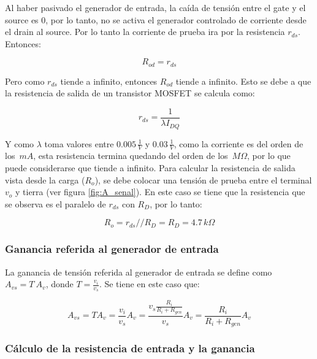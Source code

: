 \documentclass[10pt,spanish,a4paper,notitlepage]{article}
\begin{document}
Al haber pasivado el generador de entrada, la caída de tensión entre el gate y el source es 0, por lo tanto, no se activa el generador controlado de corriente desde el drain al source. Por lo tanto la corriente de prueba ira por la resistencia $r_{ds}$. Entonces: 

\begin{equation}
    R_{od}=r_{ds}
    \label{eq:A_Rod}
\end{equation}

Pero como $r_{ds}$ tiende a infinito, entonces $R_{od}$ tiende a infinito. Esto se debe a que la resistencia de salida de un transistor MOSFET se calcula como: 

\begin{equation}
    r_{ds}=\frac{1}{\lambda I_{DQ}}
    \label{eq:A_rds}
\end{equation}

Y como $\lambda$ toma valores entre $0.005\,\unit{\frac{1}{V}}$ y $0.03\,\unit{\frac{1}{V}}$, como la corriente es del orden de los  $\,\unit{mA}$, esta resistencia termina quedando del orden de los $\,\unit{M\Omega}$, por lo que puede considerarse que tiende a infinito.
Para calcular la resistencia de salida vista desde la carga ($R_{o}$), se debe colocar una tensión de prueba entre el terminal $v_{o}$ y tierra (ver figura \ref{fig:A_senal}). En este caso se tiene que la resistencia que se observa es el paralelo de $r_{ds}$ con $R_{D}$, por lo tanto:

\begin{equation}
   R_{o} =r_{ds}//R_{D}=R_{D}=4.7\,\unit{k\Omega}
    \label{eq:A_Ro}
\end{equation}

\subsubsection{Ganancia referida al generador de entrada}

La ganancia de tensión referida al generador de entrada se define como $A_{vs}=T\ A_{v}$, donde $T=\frac{v_i}{v_s}$. Se tiene en este caso que:

\begin{equation}
   A_{vs} =T A_v=\frac{v_i}{v_s} A_v=\frac{v_s \frac{R_i}{R_i + R_{gen}}}{v_s} A_v=\frac{R_i}{R_i+R_{gen}} A_v
    \label{eq:A_Avs}
\end{equation}

\subsubsection{Cálculo de la resistencia de entrada y la ganancia}
\end{document}
